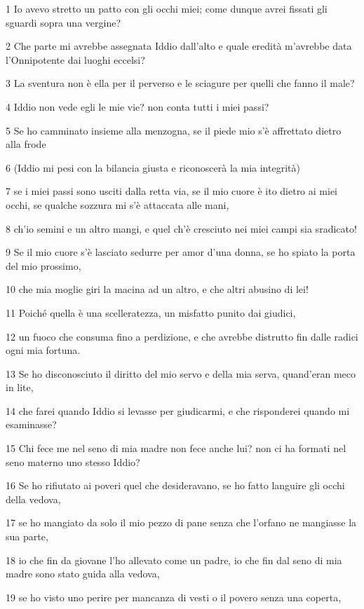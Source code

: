 \par 1 Io avevo stretto un patto con gli occhi miei; come dunque avrei fissati gli sguardi sopra una vergine?
\par 2 Che parte mi avrebbe assegnata Iddio dall'alto e quale eredità m'avrebbe data l'Onnipotente dai luoghi eccelsi?
\par 3 La sventura non è ella per il perverso e le sciagure per quelli che fanno il male?
\par 4 Iddio non vede egli le mie vie? non conta tutti i miei passi?
\par 5 Se ho camminato insieme alla menzogna, se il piede mio s'è affrettato dietro alla frode
\par 6 (Iddio mi pesi con la bilancia giusta e riconoscerà la mia integrità)
\par 7 se i miei passi sono usciti dalla retta via, se il mio cuore è ito dietro ai miei occhi, se qualche sozzura mi s'è attaccata alle mani,
\par 8 ch'io semini e un altro mangi, e quel ch'è cresciuto nei miei campi sia sradicato!
\par 9 Se il mio cuore s'è lasciato sedurre per amor d'una donna, se ho spiato la porta del mio prossimo,
\par 10 che mia moglie giri la macina ad un altro, e che altri abusino di lei!
\par 11 Poiché quella è una scelleratezza, un misfatto punito dai giudici,
\par 12 un fuoco che consuma fino a perdizione, e che avrebbe distrutto fin dalle radici ogni mia fortuna.
\par 13 Se ho disconosciuto il diritto del mio servo e della mia serva, quand'eran meco in lite,
\par 14 che farei quando Iddio si levasse per giudicarmi, e che risponderei quando mi esaminasse?
\par 15 Chi fece me nel seno di mia madre non fece anche lui? non ci ha formati nel seno materno uno stesso Iddio?
\par 16 Se ho rifiutato ai poveri quel che desideravano, se ho fatto languire gli occhi della vedova,
\par 17 se ho mangiato da solo il mio pezzo di pane senza che l'orfano ne mangiasse la sua parte,
\par 18 io che fin da giovane l'ho allevato come un padre, io che fin dal seno di mia madre sono stato guida alla vedova,
\par 19 se ho visto uno perire per mancanza di vesti o il povero senza una coperta,
